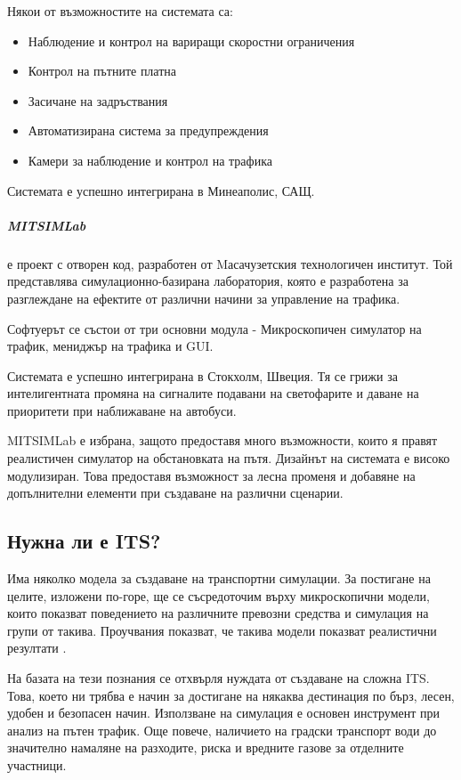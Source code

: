 	  	Някои от възможностите на системата са:
	  	\begin{itemize}
	  		\item Наблюдение и контрол на вариращи скоростни ограничения
	  		\item Контрол на пътните платна
	  		\item Засичане на задръствания
	  		\item Автоматизирана система за предупреждения
	  		\item Камери за наблюдение и контрол на трафика	  		
	  	\end{itemize}
	  	
	  	Системата е успешно интегрирана в Минеаполис, САЩ.
	  		  	
	  	\subparagraph{\emph{MITSIMLab}} е проект с отворен код, разработен от Mасачузетския технологичен институт.
	  	Той представлява симулационно-базирана лаборатория, която е разработена за разглеждане на ефектите 
	  	от различни начини за управление на трафика.
	  	
	  	Софтуерът се състои от три основни модула - Микроскопичен симулатор на трафик, мениджър на трафика
	  	и \ac{GUI}.
	  	
	  	Системата е успешно интегрирана в Стокхолм, Швеция. Тя се грижи за интелигентната промяна
	  	на сигналите подавани на светофарите и даване на приоритети при наближаване на автобуси.
	  	
	  	MITSIMLab е избрана, защото предоставя много възможности, които я правят реалистичен
	  	симулатор на обстановката на пътя. Дизайнът на системата е високо модулизиран. Това
	  	предоставя възможност за лесна променя и добавяне на допълнителни елементи при създаване
	  	на различни сценарии. \cite{Rehunathan}
	  
	\subsection{Нужна ли е \ac{ITS}?}
	
		Има няколко модела за създаване на транспортни симулации. За постигане на целите, изложени по-горе,
		ще се съсредоточим върху микроскопични модели, които показват поведението на различните превозни
		средства и симулация на групи от такива. Проучвания показват, че такива модели показват
		реалистични резултати \cite{Nagel}.
		
		На базата на тези познания се отхвърля нуждата от създаване на сложна \ac{ITS}. Това, което
		ни трябва е начин за достигане на някаква дестинация по бърз, лесен, удобен и безопасен начин.
		Използване на симулация е основен инструмент при анализ на пътен трафик. Още повече, наличието
		на градски транспорт води до значително намаляне на разходите, риска и вредните газове за отделните участници.

